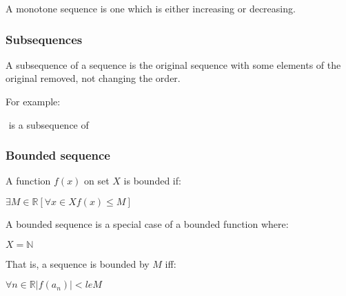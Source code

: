 A monotone sequence is one which is either increasing or decreasing.

\subsubsection{Subsequences}

A subsequence of a sequence is the original sequence with some elements of the original removed, not changing the order.

For example:

\(<1,3,5>\) is a subsequence of \(<2,1,3,4,7,5>\)

\subsubsection{Bounded sequence}

A function \(f(x)\) on set \(X\) is bounded if:

\(\exists M\in \mathbb{R} [\forall x\in X f(x)\le M]\)

A bounded sequence is a special case of a bounded function where:

\(X=\mathbb{N}\)

That is, a sequence is bounded by \(M\) iff:

\(\forall n\in \mathbb{R} |f(a_n)|<le M\)

